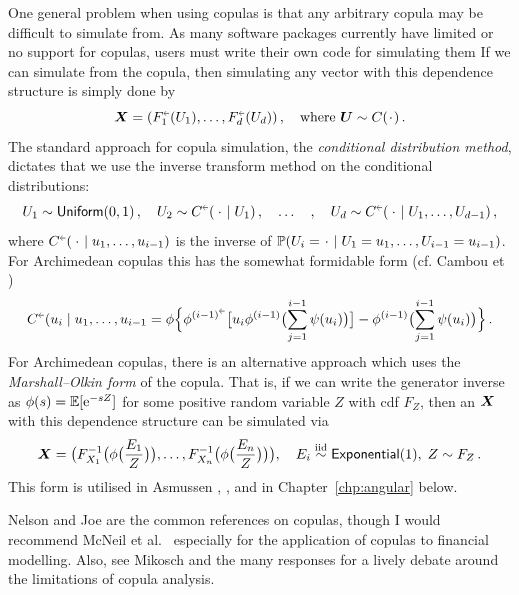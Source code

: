 One general problem when using copulas is that any arbitrary copula may be difficult to simulate from. As many software packages currently have limited or no support for copulas, users must write their own code for simulating them
If we can simulate from the copula, then simulating any vector with this dependence structure is simply done by
\[ \bfX = (F_1^{\ginv}(U_1), \dots, F_d^{\ginv}(U_d)) \,, \quad \text{where } \bfU \sim C(\argdot)\,. \]
The standard approach for copula simulation, the \emph{conditional distribution method}, dictates that we use the inverse transform method on the conditional distributions:
\[ U_1 \sim \UnifDist(0,1)\,,\quad U_2 \sim C^{\ginv}(\,\argdot \mid U_1)\,, \quad \dots \quad, \quad U_d \sim C^{\ginv}(\,\argdot \mid U_1, \dots, U_{d-1}) \,, \]
where $C^{\ginv}(\,\argdot \mid u_1, \dots, u_{i-1})$ is the inverse of $\Prob(U_i = \argdot \mid U_1 = u_1, \dots, U_{i-1} = u_{i-1})$. For Archimedean copulas this has the somewhat formidable form (cf. Cambou et \cite{cambou2017quasi})
\[ C^{\ginv}(u_i \mid u_1, \dots, u_{i-1} = \phi\Bigl\{  \phi^{(i-1)^{\ginv}} \bigl[ u_i \phi^{(i-1)}\bigl( \sum_{j=1}^{i-1} \psi(u_i) \bigr)  \bigr] - \phi^{(i-1)}\bigl( \sum_{j=1}^{i-1} \psi(u_i) \bigr) \Bigr\} \,. \]
For Archimedean copulas, there is an alternative approach which uses the \emph{Marshall--Olkin form} of the copula. That is, if we can write the generator inverse as $\phi(s) = \operatorname{{\mathbb E}}[\mathrm{e}^{-s Z}]$ for some positive random variable $Z$ with cdf $F_Z$, then an $\bm{X}$ with this dependence structure can be simulated via
\[
\bm{X} = \bigl(F_{X_1}^{-1}\bigl( \phi\bigl(\frac{E_1}{Z}\bigr) \bigr), \dots, F_{X_n}^{-1}\bigl( \phi\bigl(\frac{E_n}{Z}\bigr) \bigr) \bigr) , \quad E_i \overset{\smash{\mathrm{iid}}}{\sim} \mathsf{Exponential}(1),\; Z \sim F_Z \,.
\]
This form is utilised in Asmussen \cite{asmussen2017conditional}, \cite{Pushout}, and in Chapter~\ref{chp:angular} below.

Nelson \cite{nelsen2006introduction} and Joe \cite{joe1997multivariate} are the common references on copulas, though I would recommend McNeil et al.\ \cite{mcneil2015quantitative} especially for the application of copulas to financial modelling. Also, see Mikosch \cite{mikosch2006Copula} and the many responses for a lively debate around the limitations of copula analysis.


